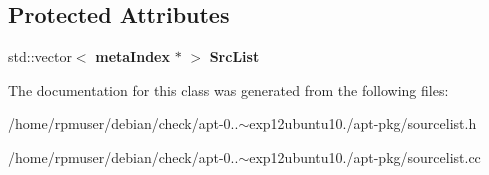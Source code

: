 \subsection*{\-Protected \-Attributes}
\begin{DoxyCompactItemize}
\item 
std\-::vector$<$ {\bf meta\-Index} $\ast$ $>$ {\bfseries \-Src\-List}\label{classpkgSourceList_a2d217e4ad22f286ec508cad5020695ba}

\end{DoxyCompactItemize}


\-The documentation for this class was generated from the following files\-:\begin{DoxyCompactItemize}
\item 
/home/rpmuser/debian/check/apt-\/0..$\sim$exp12ubuntu10./apt-\/pkg/sourcelist.\-h\item 
/home/rpmuser/debian/check/apt-\/0..$\sim$exp12ubuntu10./apt-\/pkg/sourcelist.\-cc\end{DoxyCompactItemize}
